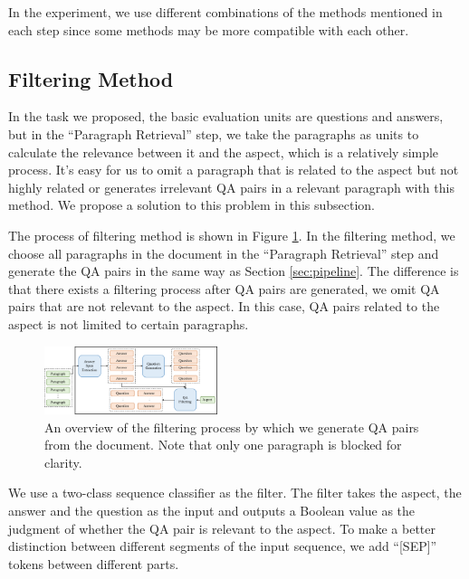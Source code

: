 In the experiment, we use different combinations of the methods mentioned in each step since some methods may be more compatible with each other.

\subsection{Filtering Method}
In the task we proposed, the basic evaluation units are questions and answers, but in the ``Paragraph Retrieval'' step, we take the paragraphs as units to calculate the relevance between it and the aspect, which is a relatively simple process. It's easy for us to omit a paragraph that is related to the aspect but not highly related or generates irrelevant QA pairs in a relevant paragraph with this method. We propose a solution to this problem in this subsection.

The process of filtering method is shown in Figure \ref{fig:filtering}. In the filtering method, we choose all paragraphs in the document in the ``Paragraph Retrieval'' step and generate the QA pairs in the same way as Section \ref{sec:pipeline}. The difference is that there exists a filtering process after QA pairs are generated, we omit QA pairs that are not relevant to the aspect. In this case, QA pairs related to the aspect is not limited to certain paragraphs.

\begin{figure}[th]
    \begin{center}
    \includegraphics[width=0.45\textwidth]{pic/filtering.pdf}
        \caption{\label{fig:filtering} An overview of the filtering process by which we generate QA pairs from the document. Note that only one paragraph is blocked for clarity.}
    \end{center}
\end{figure}

We use a two-class sequence classifier as the filter. 
The filter takes the aspect, the answer and the question as the input and outputs a Boolean value as the judgment of whether the QA pair is relevant to the aspect. 
To make a better distinction between different segments of the input sequence, we add ``[SEP]'' tokens between different parts.

